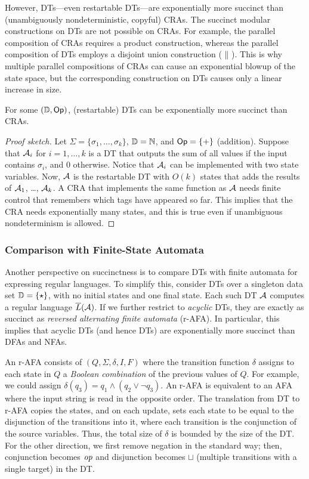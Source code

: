 However, DTs---even restartable DTs---are exponentially more succinct than (unambiguously nondeterministic, copyful) CRAs.
The succinct modular constructions on DTs are not possible on CRAs. For example, the parallel composition of CRAs requires a product construction, whereas the parallel composition of DTs employs a disjoint union construction ($\; \| \;$). This is why multiple parallel compositions of CRAs can cause an exponential blowup of the state space, but the corresponding construction on DTs causes only a linear increase in size.

\begin{theorem}
For some $(\mathbb{D}, \textsf{Op})$, (restartable) DTs can be exponentially more succinct than CRAs.
\end{theorem}
\begin{proof}[Proof sketch]
Let $\Sigma = \{\sigma_1, \ldots, \sigma_k\}$, $\mathbb{D} = \mathbb{N}$, and $\textsf{Op} = \{+\}$ (addition). Suppose that $\mathcal{A}_i$ for $i=1,\ldots,k$ is a DT that outputs the sum of all values if the input contains $\sigma_i$, and $0$ otherwise. Notice that $\mathcal{A}_i$ can be implemented with two state variables. Now, $\mathcal{A}$ is the restartable DT with $O(k)$ states that adds the results of $\mathcal{A}_1$, \ldots, $\mathcal{A}_k$. A CRA that implements the same function as $\mathcal{A}$ needs finite control that remembers which tags have appeared so far. This implies that the CRA needs exponentially many states, and this is true even if unambiguous nondeterminism is allowed.
\end{proof}

\subsubsection{Comparison with Finite-State Automata}
\label{dt:subsec:dts-and-fsa}

Another perspective on succinctness is to compare DTs with finite automata for expressing regular languages.
To simplify this, consider DTs over a singleton data set $\mathbb{D} = \{\star\}$, with no initial states and one final state. Each such DT $\mathcal{A}$ computes a regular language $\overline{L}(\mathcal{A})$.
If we further restrict to \emph{acyclic} DTs, they are exactly as succinct as \emph{reversed alternating finite automata} (r-AFA). In particular, this implies that acyclic DTs (and hence DTs) are exponentially more succinct than  DFAs and NFAs.

An r-AFA \cite{chandra1981alternation,salomaa2000efficient} consists of $(Q, \Sigma, \delta, I, F)$ where the transition function $\delta$ assigns to each state in $Q$ a \emph{Boolean combination} of the previous values of $Q$. For example, we could assign $\delta(q_3) = q_1 \land (q_2 \lor \lnot q_3)$. An r-AFA is equivalent to an AFA where the input string is read in the opposite order.
The translation from DT to r-AFA copies the states, and on each update, sets each state to be equal to the disjunction of the transitions into it, where each transition is the conjunction of the source variables. Thus, the total size of $\delta$ is bounded by the size of the DT.
For the other direction, we first remove negation in the standard way; then, conjunction becomes $\mathit{op}$ and disjunction becomes $\sqcup$ (multiple transitions with a single target) in the DT.

